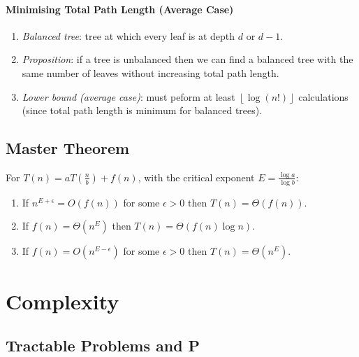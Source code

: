 \documentclass[twocolumn,english]{article}
\begin{document}
\paragraph{Minimising Total Path Length (Average Case)}
\begin{enumerate}
\item \emph{Balanced tree}: tree at which every leaf is at depth $d$ or
$d-1$.
\item \emph{Proposition}: if a tree is unbalanced then we can find a balanced
tree with the same number of leaves without increasing total path
length.
\item \emph{Lower bound (average case)}: must peform at least $\left\lfloor \log\left(n!\right)\right\rfloor $
calculations (since total path length is minimum for balanced trees).
\end{enumerate}

\subsection{Master Theorem}

For $T\left(n\right)=aT\left(\frac{n}{b}\right)+f\left(n\right)$,
with the critical exponent $E=\frac{\log a}{\log b}$:
\begin{enumerate}
\item If $n^{E+\epsilon}=O\left(f\left(n\right)\right)$ for some $\epsilon>0$
then $T\left(n\right)=\Theta\left(f\left(n\right)\right)$.
\item If $f\left(n\right)=\Theta\left(n^{E}\right)$ then $T\left(n\right)=\Theta\left(f\left(n\right)\log n\right)$.
\item If $f\left(n\right)=O\left(n^{E-\epsilon}\right)$ for some $\epsilon>0$
then $T\left(n\right)=\Theta\left(n^{E}\right)$.
\end{enumerate}

\section{Complexity}


\subsection{Tractable Problems and P}
\end{document}
